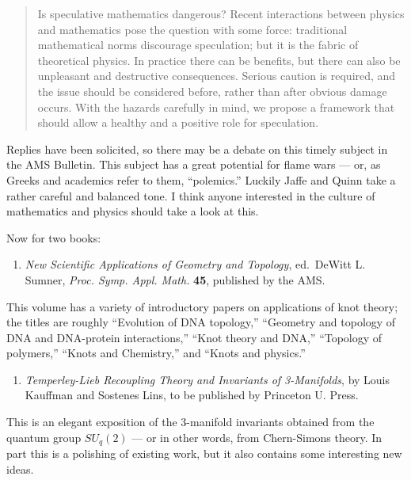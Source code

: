 \documentclass{article}
\def\tightlist{}
\begin{document}
\begin{quote}
Is speculative mathematics dangerous? Recent interactions between
physics and mathematics pose the question with some force: traditional
mathematical norms discourage speculation; but it is the fabric of
theoretical physics. In practice there can be benefits, but there can
also be unpleasant and destructive consequences. Serious caution is
required, and the issue should be considered before, rather than after
obvious damage occurs. With the hazards carefully in mind, we propose a
framework that should allow a healthy and a positive role for
speculation.
\end{quote}

Replies have been solicited, so there may be a debate on this timely
subject in the AMS Bulletin. This subject has a great potential for
flame wars --- or, as Greeks and academics refer to them, ``polemics.''
Luckily Jaffe and Quinn take a rather careful and balanced tone. I think
anyone interested in the culture of mathematics and physics should take
a look at this.

Now for two books:

\begin{enumerate}
\def\labelenumi{\arabic{enumi})}
\setcounter{enumi}{1}
\tightlist
\item
  \emph{New Scientific Applications of Geometry and Topology},
  ed.~DeWitt L. Sumner, \emph{Proc. Symp. Appl. Math.} \textbf{45},
  published by the AMS.
\end{enumerate}

This volume has a variety of introductory papers on applications of knot
theory; the titles are roughly ``Evolution of DNA topology,'' ``Geometry
and topology of DNA and DNA-protein interactions,'' ``Knot theory and
DNA,'' ``Topology of polymers,'' ``Knots and Chemistry,'' and ``Knots
and physics.''

\begin{enumerate}
\def\labelenumi{\arabic{enumi})}
\setcounter{enumi}{2}
\tightlist
\item
  \emph{Temperley-Lieb Recoupling Theory and Invariants of 3-Manifolds},
  by Louis Kauffman and Sostenes Lins, to be published by Princeton U.
  Press.
\end{enumerate}

This is an elegant exposition of the 3-manifold invariants obtained from
the quantum group \(SU_q(2)\) --- or in other words, from Chern-Simons
theory. In part this is a polishing of existing work, but it also
contains some interesting new ideas.
\end{document}
